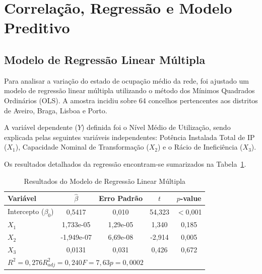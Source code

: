 \documentclass[conference]{IEEEtran}
\begin{document}
\section{Correlação, Regressão e Modelo Preditivo}

\subsection{Modelo de Regressão Linear Múltipla}

Para analisar a variação do estado de ocupação médio da rede, foi ajustado um modelo de regressão linear múltipla utilizando o método dos Mínimos Quadrados Ordinários (OLS). A amostra incidiu sobre 64 concelhos pertencentes aos distritos de Aveiro, Braga, Lisboa e Porto.

A variável dependente ($Y$) definida foi o Nível Médio de Utilização, sendo explicada pelas seguintes variáveis independentes: Potência Instalada Total de IP ($X_1$), Capacidade Nominal de Transformação ($X_2$) e o Rácio de Ineficiência ($X_3$). 

Os resultados detalhados da regressão encontram-se sumarizados na Tabela~\ref{tab:regressao_multipla}.

\begin{table}[H]
\caption{Resultados do Modelo de Regressão Linear Múltipla}
\begin{center}
\begin{tabular}{lcccc}
\toprule
\textbf{Variável} & $\hat{\beta}$ & \textbf{Erro Padrão} & $t$ & $p$-value \\
\midrule
Intercepto ($\beta_0$)  & 0,5417    & 0,010    & 54,323 & $<$0,001 \\
$X_1$  & 1,733e-05 & 1,29e-05 & 1,340  & 0,185    \\
$X_2$      & -1,949e-07& 6,69e-08 & -2,914 & 0,005    \\
$X_3$   & 0,0131    & 0,031    & 0,426  & 0,672    \\
\bottomrule
\multicolumn{5}{l}{\small $R^2 = 0{,}276$\quad $R^2_{adj} = 0{,}240$\quad $F = 7{,}63$\quad $p = 0{,}0002$}
\end{tabular}
\label{tab:regressao_multipla}
\end{center}
\end{table}
\end{document}
